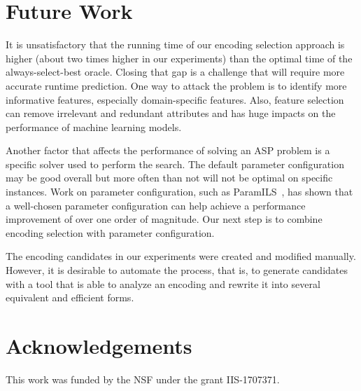 \documentclass[submission,copyright,creativecommons]{eptcs}
\begin{document}
\section{Future Work}

It is unsatisfactory that the running time of our encoding selection approach 
is higher (about two times higher in our experiments) than the optimal time of 
the always-select-best oracle. Closing that gap is a challenge that will 
require more accurate runtime prediction. One way to attack the problem is
to identify more informative features, especially domain-specific features.
Also, feature selection can remove irrelevant and redundant attributes and has huge impacts on the performance of machine learning models. 

Another factor that affects the performance of solving an ASP problem is a 
specific solver used to perform the search. The default parameter configuration may be good overall but more 
often than not will not be optimal on specific instances. Work on parameter
configuration, such as ParamILS~\cite{HutterHLS09}, has shown that a 
well-chosen parameter configuration can help achieve a performance improvement 
of over one order of magnitude. Our next step is to combine encoding selection with parameter 
configuration. 

The encoding candidates in our experiments were created and modified manually. 
However, it is desirable to automate the 
process, that is, to generate candidates with a tool that is able to analyze 
an encoding and rewrite it into several equivalent and efficient forms. 

\section*{Acknowledgements}
This work was funded by the NSF under the grant IIS-1707371.

\nocite{*}


\end{document}
